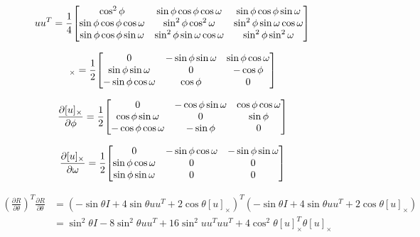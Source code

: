 \documentclass[12pt]{article}
\newcommand*{\Scale}[2][4]{\scalebox{#1}{$#2$}}%
\begin{document}
\begin{align}
uu^T &= \frac{1}{4}\Scale[1.0]{\begin{bmatrix}
\cos^2\phi & \sin\phi\cos\phi\cos\omega & \sin\phi\cos\phi\sin\omega \\
\sin\phi\cos\phi\cos\omega & \sin^2\phi\cos^2\omega & \sin^2\phi\sin\omega\cos\omega \\
\sin\phi\cos\phi\sin\omega & \sin^2\phi\sin\omega\cos\omega & \sin^2\phi\sin^2\omega
\end{bmatrix}} 
\end{align}

\begin{align}
[u]_\times &= \frac{1}{2}\Scale[1.0]{\begin{bmatrix}
0 & -\sin\phi\sin\omega & \sin\phi\cos\omega \\
\sin\phi\sin\omega & 0 & -\cos\phi \\
-\sin\phi\cos\omega & \cos\phi & 0
\end{bmatrix}} 
\end{align}

\begin{align}
\frac{\partial[u]_\times}{\partial\phi} &= \frac{1}{2}\Scale[1.0]{\begin{bmatrix}
0 & -\cos\phi\sin\omega & \cos\phi\cos\omega \\
\cos\phi\sin\omega & 0 & \sin\phi \\
-\cos\phi\cos\omega & -\sin\phi & 0
\end{bmatrix}} 
\end{align}

\begin{align}
\frac{\partial[u]_\times}{\partial\omega} &= \frac{1}{2}\Scale[1.0]{\begin{bmatrix}
0 & -\sin\phi\cos\omega & -\sin\phi\sin\omega \\
\sin\phi\cos\omega & 0 & 0 \\
\sin\phi\sin\omega & 0 & 0
\end{bmatrix}} 
\end{align}

\begin{align}
(\frac{\partial R}{\partial\theta})^T\frac{\partial R}{\partial\theta} &=  (-\sin\theta I + 4\sin\theta uu^T + 2\cos\theta[u]_\times)^T(-\sin\theta I + 4\sin\theta uu^T + 2\cos\theta[u]_\times) \\
  &=  \sin^2\theta I - 8\sin^2\theta uu^T  + 16\sin^2uu^Tuu^T  + 4\cos^2 \theta[u]_\times^T\theta[u]_\times  
\end{align}
\end{document}
